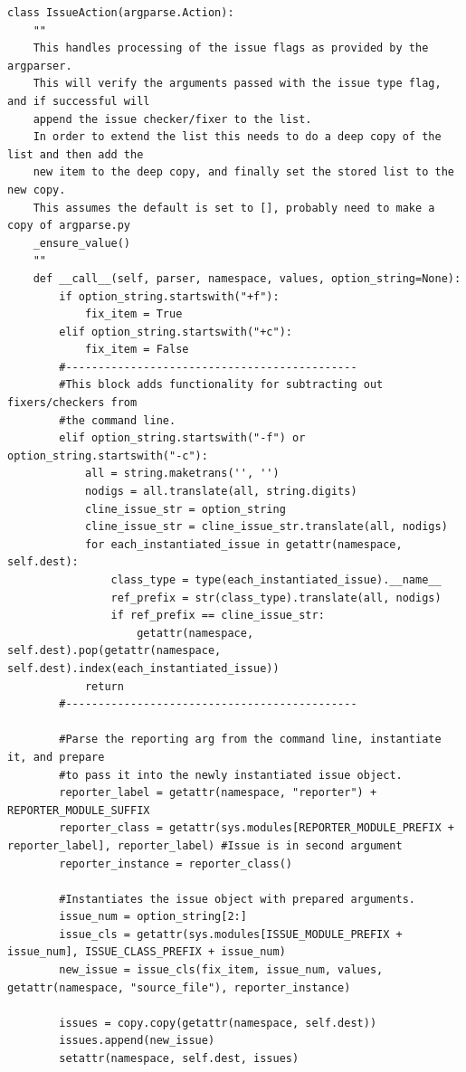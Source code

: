\documentclass[11pt]{scrreprt}
\begin{document}
\begin{lstlisting}[frame=single,basicstyle=\small]
class IssueAction(argparse.Action):
    ""
    This handles processing of the issue flags as provided by the argparser.
    This will verify the arguments passed with the issue type flag, and if successful will
    append the issue checker/fixer to the list.
    In order to extend the list this needs to do a deep copy of the list and then add the
    new item to the deep copy, and finally set the stored list to the new copy.
    This assumes the default is set to [], probably need to make a copy of argparse.py
    _ensure_value()
    ""
    def __call__(self, parser, namespace, values, option_string=None):
        if option_string.startswith("+f"):
            fix_item = True
        elif option_string.startswith("+c"):
            fix_item = False
        #---------------------------------------------
        #This block adds functionality for subtracting out fixers/checkers from
        #the command line.
        elif option_string.startswith("-f") or option_string.startswith("-c"):
            all = string.maketrans('', '')
            nodigs = all.translate(all, string.digits)
            cline_issue_str = option_string
            cline_issue_str = cline_issue_str.translate(all, nodigs)
            for each_instantiated_issue in getattr(namespace, self.dest):
                class_type = type(each_instantiated_issue).__name__
                ref_prefix = str(class_type).translate(all, nodigs)
                if ref_prefix == cline_issue_str:
                    getattr(namespace, self.dest).pop(getattr(namespace, self.dest).index(each_instantiated_issue))
            return
        #---------------------------------------------

        #Parse the reporting arg from the command line, instantiate it, and prepare
        #to pass it into the newly instantiated issue object.
        reporter_label = getattr(namespace, "reporter") + REPORTER_MODULE_SUFFIX
        reporter_class = getattr(sys.modules[REPORTER_MODULE_PREFIX + reporter_label], reporter_label) #Issue is in second argument
        reporter_instance = reporter_class()

        #Instantiates the issue object with prepared arguments.
        issue_num = option_string[2:]
        issue_cls = getattr(sys.modules[ISSUE_MODULE_PREFIX + issue_num], ISSUE_CLASS_PREFIX + issue_num)
        new_issue = issue_cls(fix_item, issue_num, values, getattr(namespace, "source_file"), reporter_instance)

        issues = copy.copy(getattr(namespace, self.dest))
        issues.append(new_issue)
        setattr(namespace, self.dest, issues)


\end{lstlisting}
\end{document}
